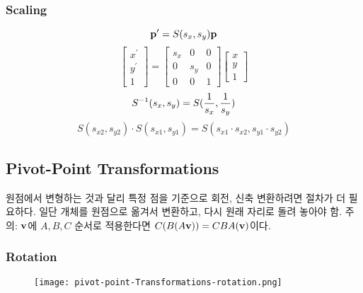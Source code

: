 \subsubsection{Scaling}

$$\bold{p}^\prime = S(s_x, s_y)\bold{p}$$
$$
\begin{bmatrix}
  x^\prime \\
  y^\prime \\
  1
\end{bmatrix}
{=}
\begin{bmatrix}
  s_x & 0 & 0 \\
  0 & s_y & 0 \\
  0 & 0 & 1
\end{bmatrix}
\begin{bmatrix}
  x \\
  y \\
  1
\end{bmatrix}
$$
$$S^{-1}(s_x, s_y) = S({1 \over s_x}, {1 \over s_y})$$
$$S(s_{x2}, s_{y2}) \cdot S(s_{x1}, s_{y1}) = S(s_{x1} \cdot s_{x2}, s_{y1} \cdot s_{y2})$$

\subsection{Pivot-Point Transformations}

원점에서 변형하는 것과 달리 특정 점을 기준으로 회전, 신축 변환하려면 절차가 더 필요하다. 일단 개체를 원점으로 옮겨서 변환하고, 다시 원래 자리로 돌려 놓아야 함. 주의: $\bold{v}$에 $A, B, C$ 순서로 적용한다면 $C(B(A\bold{v})) = CBA(\bold{v})$이다.

\subsubsection{Rotation}

\begin{figure}[h]
  \centering
  \texttt{[image: pivot-point-Transformations-rotation.png]}
\end{figure}

